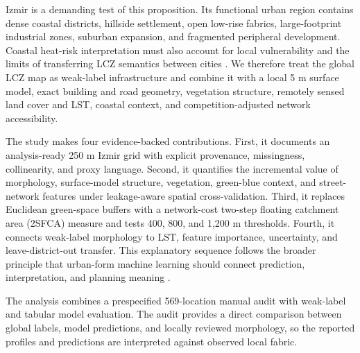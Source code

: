 Izmir is a demanding test of this proposition. Its functional urban region
contains dense coastal districts, hillside settlement, open low-rise fabrics,
large-footprint industrial zones, suburban expansion, and fragmented
peripheral development. Coastal heat-risk interpretation must also account for
local vulnerability and the limits of transferring LCZ semantics between
cities \citep{canguzel2024ClimateChange,zhang2025ApplicabLocal}. We therefore
treat the global LCZ map as weak-label infrastructure and combine it with a
local 5 m surface model, exact building and road geometry, vegetation structure, remotely
sensed land cover and LST, coastal context, and competition-adjusted
network accessibility.

The study makes four evidence-backed contributions. First, it documents an
analysis-ready 250 m Izmir grid with explicit provenance, missingness,
collinearity, and proxy language. Second, it quantifies the incremental value
of morphology, surface-model structure, vegetation, green-blue context, and street-network
features under leakage-aware spatial cross-validation. Third, it replaces
Euclidean green-space buffers with a network-cost two-step floating catchment
area (2SFCA) measure and tests 400, 800, and 1,200 m thresholds. Fourth, it
connects weak-label morphology to LST, feature importance, uncertainty, and
leave-district-out transfer. This explanatory sequence follows the broader
principle that urban-form machine learning should connect prediction,
interpretation, and planning meaning \citep{karl2026RelationBetween}.

The analysis combines a prespecified 569-location manual audit with weak-label and tabular model evaluation. The audit provides a direct comparison between global labels, model predictions, and locally reviewed morphology, so the reported profiles and predictions are interpreted against observed local fabric.
